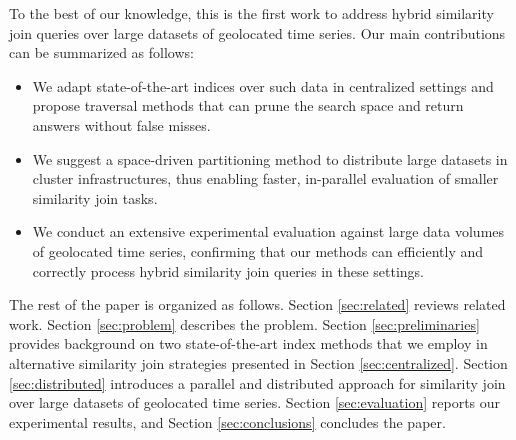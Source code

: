 To the best of our knowledge, this is the first work to address hybrid similarity join queries over large datasets of geolocated time series. Our main contributions can be summarized as follows:

\begin{itemize}
 \item We adapt state-of-the-art indices over such data in centralized settings and propose traversal methods that can prune the search space and return answers without false misses.
 \item We suggest a space-driven partitioning method to distribute large datasets in cluster infrastructures, thus enabling faster, in-parallel evaluation of smaller similarity join tasks.
 \item We conduct an extensive experimental evaluation against large data volumes of geolocated time series, confirming that our methods can efficiently and correctly process hybrid similarity join queries in these settings.
\end{itemize}

The rest of the paper is organized as follows. Section \ref{sec:related} reviews related work. Section \ref{sec:problem} describes the problem. Section \ref{sec:preliminaries} provides background on two state-of-the-art index methods that we employ in alternative similarity join strategies presented in Section \ref{sec:centralized}. Section \ref{sec:distributed} introduces a parallel and distributed approach for similarity join over large datasets of geolocated time series. Section \ref{sec:evaluation} reports our experimental results, and Section \ref{sec:conclusions} concludes the paper.